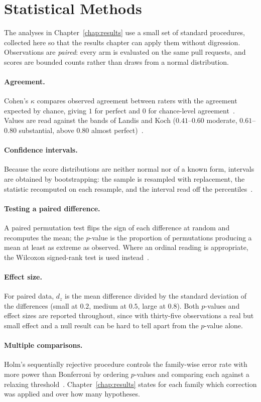 \section{Statistical Methods}
\label{sec:bg-stats}

The analyses in Chapter~\ref{chap:results} use a small set of standard
procedures, collected here so that the results chapter can apply them without
digression. Observations are \emph{paired}: every arm is evaluated on the
same pull requests, and scores are bounded counts rather than draws from a
normal distribution.

\paragraph{Agreement.}
Cohen's $\kappa$ compares observed agreement between raters with the agreement
expected by chance, giving $1$ for perfect and $0$ for chance-level
agreement~\cite{cohen1960kappa}. Values are read against the bands of Landis
and Koch ($0.41$--$0.60$ moderate, $0.61$--$0.80$ substantial, above $0.80$
almost perfect)~\cite{landiskoch1977}.

\paragraph{Confidence intervals.}
Because the score distributions are neither normal nor of a known form,
intervals are obtained by bootstrapping: the sample is resampled with
replacement, the statistic recomputed on each resample, and the interval read
off the percentiles~\cite{efron1993bootstrap}.

\paragraph{Testing a paired difference.}
A paired permutation test flips the sign of each difference at random and
recomputes the mean; the $p$-value is the proportion of permutations producing
a mean at least as extreme as observed. Where an ordinal reading is
appropriate, the Wilcoxon signed-rank test is used
instead~\cite{wilcoxon1945}.

\paragraph{Effect size.}
For paired data, $d_z$ is the mean difference divided by the standard
deviation of the differences (small at $0.2$, medium at $0.5$, large at
$0.8$). Both $p$-values and effect sizes are reported throughout, since with
thirty-five observations a real but small effect and a null result can be hard to
tell apart from the $p$-value alone.

\paragraph{Multiple comparisons.}
Holm's sequentially rejective procedure controls the family-wise error rate
with more power than Bonferroni by ordering $p$-values and comparing each
against a relaxing threshold~\cite{holm1979}. Chapter~\ref{chap:results}
states for each family which correction was applied and over how many
hypotheses.

